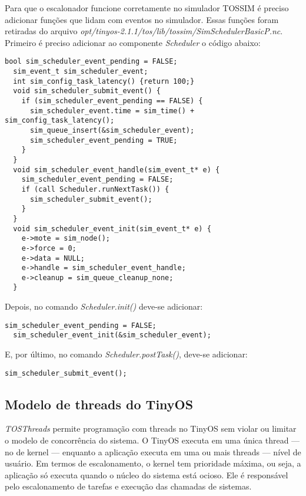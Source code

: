 \documentclass[a4paper,onecolumn, 10pt]{article}
\begin{document}
Para que o escalonador funcione corretamente no simulador TOSSIM é preciso adicionar funções que lidam com eventos no
simulador. Essas funções foram retiradas do arquivo
\textit{opt/tinyos-2.1.1/tos/lib/tossim/SimSchedulerBasicP.nc}.
Primeiro é preciso adicionar ao componente \textit{Scheduler} o código abaixo:
\begin{lstlisting}[frame=single]
  bool sim_scheduler_event_pending = FALSE;
  sim_event_t sim_scheduler_event;
  int sim_config_task_latency() {return 100;}
  void sim_scheduler_submit_event() {
    if (sim_scheduler_event_pending == FALSE) {
      sim_scheduler_event.time = sim_time() + sim_config_task_latency();
      sim_queue_insert(&sim_scheduler_event);
      sim_scheduler_event_pending = TRUE;
    }
  }
  void sim_scheduler_event_handle(sim_event_t* e) {
    sim_scheduler_event_pending = FALSE;
    if (call Scheduler.runNextTask()) {
      sim_scheduler_submit_event();
    }
  }
  void sim_scheduler_event_init(sim_event_t* e) {
    e->mote = sim_node();
    e->force = 0;
    e->data = NULL;
    e->handle = sim_scheduler_event_handle;
    e->cleanup = sim_queue_cleanup_none;
  }
\end{lstlisting}

Depois, no comando \textit{Scheduler.init()} deve-se adicionar:
\begin{lstlisting}[frame=single]
  sim_scheduler_event_pending = FALSE;
  sim_scheduler_event_init(&sim_scheduler_event);
\end{lstlisting}
E, por último, no comando \textit{Scheduler.postTask()}, deve-se adicionar:
\begin{lstlisting}[frame=single]
  sim_scheduler_submit_event();
\end{lstlisting}

\subsection{Modelo de threads do TinyOS}

\textit{TOSThreads} permite programação com threads no TinyOS sem violar ou limitar o modelo de concorrência do
sistema. O TinyOS executa em uma única thread --- no de kernel --- enquanto a aplicação executa 
em uma ou mais threads --- nível de usuário.
Em termos de escalonamento, o kernel tem prioridade máxima, ou seja, a aplicação só executa quando o núcleo do sistema
está ocioso. Ele é responsável pelo escalonamento de tarefas e execução das chamadas de sistemas. 
\end{document}

